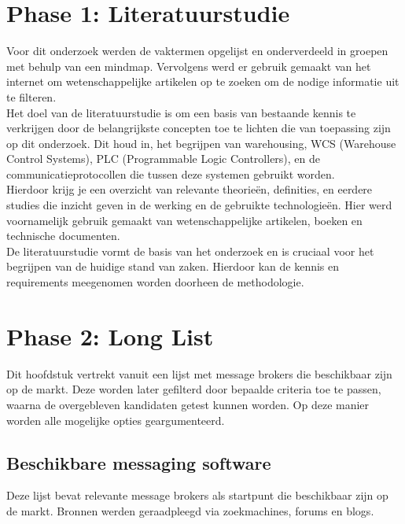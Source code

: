 \section{Phase 1: Literatuurstudie}
Voor dit onderzoek werden de vaktermen opgelijst en onderverdeeld in groepen met behulp van een mindmap.
Vervolgens werd er gebruik gemaakt van het internet om wetenschappelijke artikelen op te zoeken om de nodige informatie uit te filteren.
\\
Het doel van de literatuurstudie is om een basis van bestaande kennis te verkrijgen door de belangrijkste concepten toe te lichten die van toepassing zijn op dit onderzoek. 
Dit houd in, het begrijpen van warehousing, WCS (Warehouse Control Systems), PLC (Programmable Logic Controllers), en de communicatieprotocollen die tussen deze systemen gebruikt worden.
\\
Hierdoor krijg je een overzicht van relevante theorieën, definities, en eerdere studies die inzicht geven in de werking en de gebruikte technologieën.
Hier werd voornamelijk gebruik gemaakt van wetenschappelijke artikelen, boeken en technische documenten.
\\
De literatuurstudie vormt de basis van het onderzoek en is cruciaal voor het begrijpen van de huidige stand van zaken.
Hierdoor kan de kennis en requirements meegenomen worden doorheen de methodologie.

\section{Phase 2: Long List}
Dit hoofdstuk vertrekt vanuit een lijst met message brokers die beschikbaar zijn op de markt.
Deze worden later gefilterd door bepaalde criteria toe te passen, waarna de overgebleven kandidaten getest kunnen worden.
Op deze manier worden alle mogelijke opties geargumenteerd.

\subsection{Beschikbare messaging software}
Deze lijst bevat relevante message brokers als startpunt die beschikbaar zijn op de markt.
Bronnen werden geraadpleegd via zoekmachines, forums en blogs.

